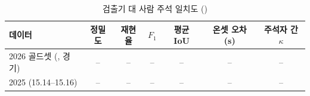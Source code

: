 \begin{table}[htbp]
  \centering
  \caption{검출기 대 사람 주석 일치도 ()}
  \label{tab:detector}
  \small
  \begin{tabular}{@{}lcccccc@{}}
    \toprule
    데이터 & 정밀도 & 재현율 & $F_1$ & 평균 IoU & 온셋 오차 (s) & 주석자 간 $\kappa$ \\
    \midrule
    2026 골드셋 (\goldPatchPublic{}, \numGoldMatches{} 경기) & -- & -- & -- & -- & -- & -- \\
    2025 (15.14--15.16) & -- & -- & -- & -- & -- & -- \\
    \bottomrule
  \end{tabular}
\end{table}
